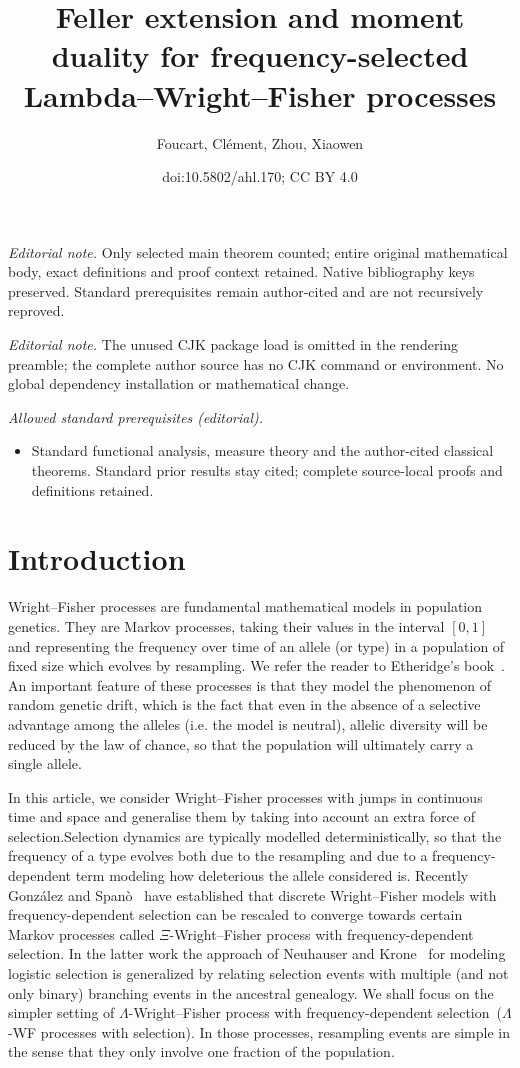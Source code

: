 \documentclass[10pt]{amsart}
\title{Feller extension and moment duality for frequency-selected Lambda--Wright--Fisher processes}
\author{Foucart, Clément, Zhou, Xiaowen}
\date{doi:10.5802/ahl.170; CC BY 4.0}
\theoremstyle{definition}\newtheorem{defi}[theo]{Definition}\newtheorem{rema}[theo]{Remark}\newtheorem{exam}[theo]{Example}\newtheorem{exem}[theo]{Example}\newtheorem{nota}[theo]{Notation}
\begin{document}
\maketitle
\noindent\textit{Editorial note.} Only selected main theorem counted; entire original mathematical body, exact definitions and proof context retained. Native bibliography keys preserved. Standard prerequisites remain author-cited and are not recursively reproved.\par\medskip
\noindent\textit{Editorial note.} The unused CJK package load is omitted in the rendering preamble; the complete author source has no CJK command or environment. No global dependency installation or mathematical change.\par\medskip
\noindent\textit{Allowed standard prerequisites (editorial).}\begin{itemize}
\item Standard functional analysis, measure theory and the author-cited classical theorems. Standard prior results stay cited; complete source-local proofs and definitions retained.
\end{itemize}\medskip
\section{Introduction}
Wright--Fisher processes are fundamental mathematical models in population genetics. They are Markov processes, taking their values in the interval $[0,1]$ and representing the frequency over time of an allele (or type) in a population of fixed size which evolves by resampling. We refer the reader to Etheridge's book~\cite{etheridge2011}. An important feature of these processes is that they model the phenomenon of random genetic drift, which is the fact that even in the absence of a selective advantage among the alleles (i.e. the model is neutral), allelic diversity will be reduced by the law of chance, so that the population will ultimately carry a single allele.

In this article, we consider Wright--Fisher processes with jumps in continuous time and space and generalise them by taking into account an extra force of selection.\linebreak Selection dynamics are typically modelled deterministically, so that the frequency of a type evolves both due to the resampling and due to a frequency-dependent term modeling how deleterious the allele considered is. Recently González and Spanò~\cite{zbMATH06873684} have established that discrete Wright--Fisher models with frequency-dependent selection can be rescaled to converge towards certain Markov processes called $\Xi$-Wright--Fisher process with frequency-dependent selection. In the latter work the approach of Neuhauser and Krone~\cite{zbMATH01078990} for modeling logistic selection is generalized by relating selection events with multiple (and not only binary) branching events in the ancestral genealogy. We shall focus on the simpler setting of $\Lambda$-Wright--Fisher process with frequency-dependent selection~($\Lambda$-WF processes with selection). In those processes, resampling events are simple in the sense that they only involve one fraction of the population.
\end{document}
